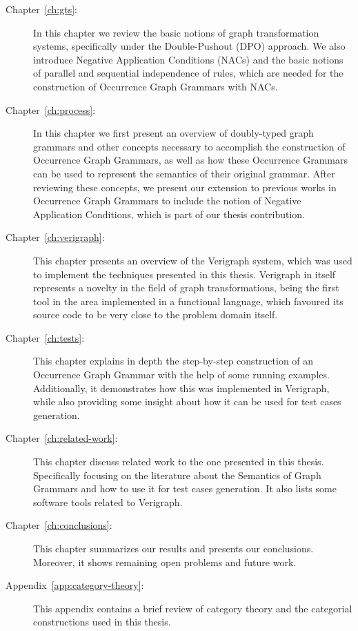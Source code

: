 \begin{description}
	\item[Chapter~\ref{ch:gts}:] In this chapter we review the basic notions of graph transformation systems, specifically under the Double-Pushout (DPO) approach. We also introduce Negative Application Conditions (NACs) and the basic notions of parallel and sequential independence of rules, which are needed for the construction of Occurrence Graph Grammars with NACs.

  \item[Chapter~\ref{ch:process}:] In this chapter we first present an overview of doubly-typed graph grammars and other concepts necessary to accomplish the construction of Occurrence Graph Grammars, as well as how these Occurrence Grammars can be used to represent the semantics of their original grammar. After reviewing these concepts, we present our extension to previous works in Occurrence Graph Grammars to include the notion of Negative Application Conditions, which is part of our thesis contribution.

  \item[Chapter~\ref{ch:verigraph}:] This chapter presents an overview of the Verigraph system, which was used to implement the techniques presented in this thesis. Verigraph in itself represents a novelty in the field of graph transformations, being the first tool in the area implemented in a functional language, which favoured its source code to be very close to the problem domain itself.

  \item[Chapter~\ref{ch:tests}:] This chapter explains in depth the step-by-step construction of an Occurrence Graph Grammar with the help of some running examples. Additionally, it demonstrates how this was implemented in Verigraph, while also providing some insight about how it can be used for test cases generation.

  \item[Chapter~\ref{ch:related-work}:] This chapter discuss related work to the one presented in this thesis. Specifically focusing on the literature about the Semantics of Graph Grammars and how to use it for test cases generation. It also lists some software tools related to Verigraph.

  \item[Chapter~\ref{ch:conclusions}:] This chapter summarizes our results and presents our conclusions. Moreover, it shows remaining open problems and future work.

  \item[Appendix~\ref{app:category-theory}:] This appendix contains a brief review of category theory and the categorial constructions used in this thesis.

\end{description}
